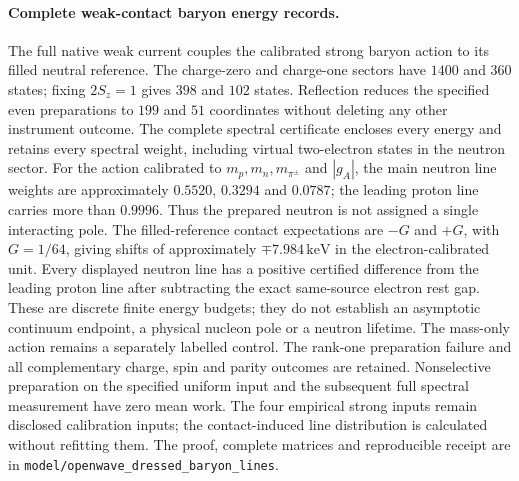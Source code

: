 \paragraph{Complete weak-contact baryon energy records.}
The full native weak current couples the calibrated strong baryon action to
its filled neutral reference.  The charge-zero and charge-one sectors have
$1400$ and $360$ states; fixing $2S_z=1$ gives $398$ and $102$ states.
Reflection reduces the specified even preparations to $199$ and $51$
coordinates without deleting any other instrument outcome.  The complete
spectral certificate encloses every energy and retains every spectral
weight, including virtual two-electron states in the neutron sector.
For the action calibrated to $m_p,m_n,m_{\pi^\pm}$ and $|g_A|$, the main
neutron line weights are approximately $0.5520$, $0.3294$ and $0.0787$;
the leading proton line carries more than $0.9996$.  Thus the prepared
neutron is not assigned a single interacting pole.  The filled-reference
contact expectations are $-G$ and $+G$, with $G=1/64$, giving shifts of
approximately $\mp7.984\,\mathrm{keV}$ in the electron-calibrated unit.
Every displayed neutron line has a positive certified difference from the
leading proton line after subtracting the exact same-source electron rest
gap.  These are discrete finite energy budgets; they do not establish an
asymptotic continuum endpoint, a physical nucleon pole or a neutron
lifetime.  The mass-only action remains a separately labelled control.
The rank-one preparation failure and all complementary charge, spin and
parity outcomes are retained.  Nonselective preparation on the specified
uniform input and the subsequent full spectral measurement have zero mean
work.  The four empirical strong inputs remain disclosed calibration
inputs; the contact-induced line distribution is calculated without
refitting them.  The proof, complete matrices and reproducible receipt are
in \texttt{model/openwave\_dressed\_baryon\_lines}.
